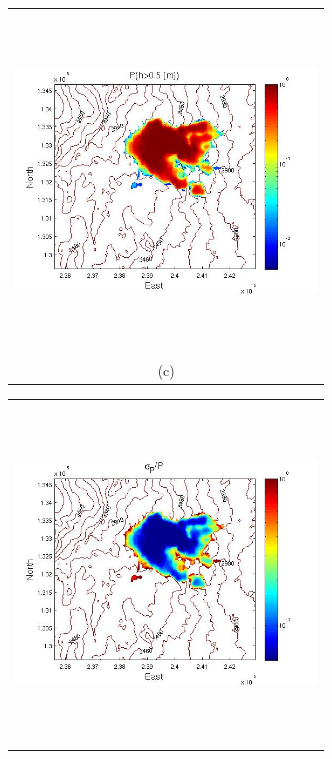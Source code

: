 \documentclass[12pt]{article}
\newcommand{\Pic}[2][0.85]{\begin{center}\texttt{[image: \#2]}
 \end{center} }
\begin{document}
\begin{figure}[H]
\begin{minipage}{0.6\textwidth}
\begin{tabular}{c}
        \end{tabular}
    \end{minipage} 
        \begin{minipage}[b]{0.6\textwidth}
        \begin{tabular}{c}
       \includegraphics[width=8cm,height=9cm,keepaspectratio]{figs/Galeras_3_P_5m.jpg}\\
        (c)
        \end{tabular}
    \end{minipage}
    \begin{minipage}{0.6\textwidth}
        \begin{tabular}{c}
	\includegraphics[width=8cm,height=9cm,keepaspectratio]{figs/Galeras_3_sigma_5m.jpg}\\

\end{tabular}
\end{minipage}
\end{figure}
\end{document}
